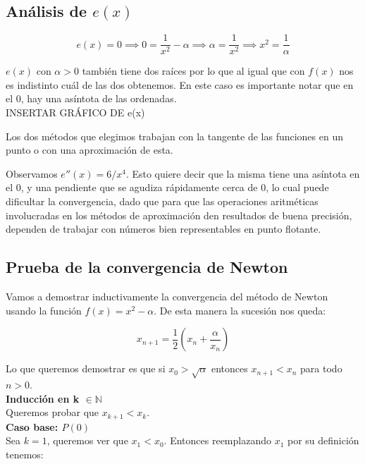 \subsection{Análisis de $e(x)$}

\begin{displaymath}
    e(x) = 0 \implies 0 = \frac{1}{x^2} - \alpha \implies \alpha = \frac{1}{x^2} \implies x^2 = \frac{1}{\alpha}
\end{displaymath}

$e(x)$ con $\alpha > 0$ también tiene dos raíces por lo que al igual que con
$f(x)$ nos es indistinto cuál de las dos obtenemos. En este caso es importante
notar que en el 0, hay una asíntota de las ordenadas.\\

INSERTAR GRÁFICO DE e(x)
 
Los dos métodos que elegimos trabajan con la tangente de las funciones en un
punto o con una aproximación de esta.

Observamos $e''(x) = 6/x^4$. Esto quiere decir que la misma tiene una asíntota en el 0,
y una pendiente que se agudiza rápidamente cerca de 0, lo cual puede dificultar la convergencia,
dado que para que las operaciones aritméticas involucradas en los métodos de aproximación 
den resultados de buena precisión, dependen de trabajar con números bien representables en punto flotante.

\subsection{Prueba de la convergencia de Newton}
Vamos a demostrar inductivamente la convergencia del método de Newton usando la función $\displaystyle f(x) = x^2 - \alpha$. De esta manera la sucesión nos queda:

\begin{displaymath}
    x_{n + 1} = \frac{1}{2}(x_n + \frac{\alpha}{x_n})
\end{displaymath}

Lo que queremos demostrar es que si $x_0 > \sqrt{\alpha}$ entonces $x_{n + 1} < x_n$ para todo $n > 0$.\\

{\large \bf Inducción en k $\in \mathbb{N}$}\\
Queremos probar que $x_{k + 1} < x_k$.\\

{\bf Caso base: $P(0)$}\\
Sea $k = 1$, queremos ver que $x_1 < x_0$. Entonces reemplazando $x_1$ por su definición tenemos:

